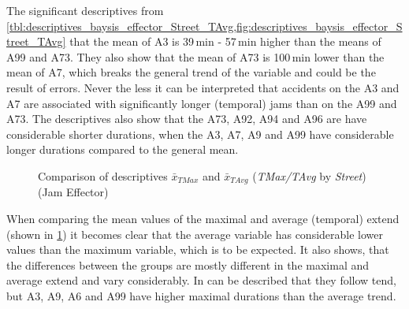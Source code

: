 The significant descriptives from \cref{tbl:descriptives_baysis_effector_Street_TAvg,fig:descriptives_baysis_effector_Street_TAvg} that the mean of A3 is 39\,min - 57\,min higher than the means of A99 and A73. They also show that the mean of A73 is 100\,min lower than the mean of A7, which breaks the general trend of the variable and could be the result of errors. Never the less it can be interpreted that accidents on the A3 and A7 are associated with significantly longer (temporal) jams than on the A99 and A73. The descriptives also show that the A73, A92, A94 and A96 are have considerable shorter durations, when the A3, A7, A9 and A99 have considerable longer durations compared to the general mean.
\begin{figure}[ht!]
	\data 
	\pgfplotstablesort[sort key=meanTAvg, sort cmp=float >]{\datasorted}{\data}
	\tiny
	\centering
	\caption{Comparison of descriptives $\bar{x}_{TMax}$ and $\bar{x}_{TAvg}$ (\textit{TMax/TAvg} by \textit{Street}) (Jam Effector)}
	\label{fig:baysis_effector_meancomparison_Str_temporal}
\end{figure}
When comparing the mean values of the maximal and average (temporal) extend (shown in \cref{fig:baysis_effector_meancomparison_Str_temporal}) it becomes clear that the average variable has considerable lower values than the maximum variable, which is to be expected. It also shows, that the differences between the groups are mostly different in the maximal and average extend and vary considerably. In can be described that they follow tend, but A3, A9, A6 and A99 have higher maximal durations than the average trend.

